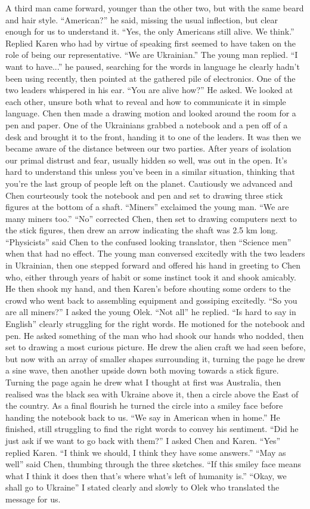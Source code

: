 \documentclass[a4paper]{article}
\begin{document}
A third man came forward, younger than the other two, but with the same beard and hair style. “American?” he said, missing the usual inflection, but clear enough for us to understand it.
“Yes, the only Americans still alive. We think.” Replied Karen who had by virtue of speaking first seemed to have taken on the role of being our representative.
“We are Ukrainian.” The young man replied. “I want to have...” he paused, searching for the words in language he clearly hadn’t been using recently, then pointed at the gathered pile of electronics. One of the two leaders whispered in his ear.
“You are alive how?” He asked.
We looked at each other, unsure both what to reveal and how to communicate it in simple language. Chen then made a drawing motion and looked around the room for a pen and paper. One of the Ukrainians grabbed a notebook and a pen off of a desk and brought it to the front, handing it to one of the leaders.
It was then we became aware of the distance between our two parties. After years of isolation our primal distrust and fear, usually hidden so well, was out in the open. It’s hard to understand this unless you’ve been in a similar situation, thinking that you’re the last group of people left on the planet. Cautiously we advanced and Chen courteously took the notebook and pen and set to drawing three stick figures at the bottom of a shaft.
“Miners” exclaimed the young man. “We are many miners too.”
“No” corrected Chen, then set to drawing computers next to the stick figures, then drew an arrow indicating the shaft was 2.5 km long. “Physicists” said Chen to the confused looking translator, then “Science men” when that had no effect.
The young man conversed excitedly with the two leaders in Ukrainian, then one stepped forward and offered his hand in greeting to Chen who, either through years of habit or some instinct took it and shook amicably. He then shook my hand, and then Karen’s before shouting some orders to the crowd who went back to assembling equipment and gossiping excitedly.
“So you are all miners?” I asked the young Olek.
“Not all” he replied. “Is hard to say in English” clearly struggling for the right words. He motioned for the notebook and pen. He asked something of the man who had shook our hands who nodded, then set to drawing a most curious picture.
He drew the alien craft we had seen before, but now with an array of smaller shapes surrounding it, turning the page he drew a sine wave, then another upside down both moving towards a stick figure. Turning the page again he drew what I thought at first was Australia, then realised was the black sea with Ukraine above it, then a circle above the East of the country. As a final flourish he turned the circle into a smiley face before handing the notebook back to us. “We say in American when in home.” He finished, still struggling to find the right words to convey his sentiment.
“Did he just ask if we want to go back with them?” I asked Chen and Karen.
“Yes” replied Karen. “I think we should, I think they have some answers.”
“May as well” said Chen, thumbing through the three sketches. “If this smiley face means what I think it does then that’s where what’s left of humanity is.”
“Okay, we shall go to Ukraine” I stated clearly and slowly to Olek who translated the message for us.
\end{document}
